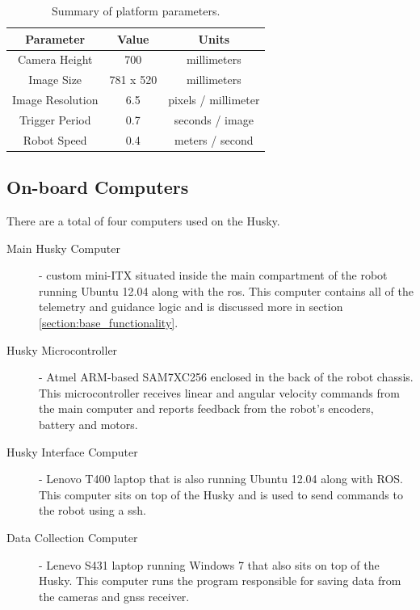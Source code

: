 \begin{table}
    \begin{center}
    \caption{Summary of platform parameters.}
    \begin{tabular}[c]{|c|c|c|}
        \hline
        Parameter & Value & Units \\
        \hline
        Camera Height    & 700       & millimeters         \\
        Image Size       & 781 x 520 & millimeters         \\
        Image Resolution & 6.5       & pixels / millimeter \\
        Trigger Period   & 0.7       & seconds / image     \\
        Robot Speed      & 0.4       & meters / second     \\
        \hline
    \end{tabular}
    \label{table:platform_params}
   \end{center}
\end{table}

\subsection{On-board Computers}

There are a total of four computers used on the Husky.

\begin{description}
\item[Main Husky Computer] - custom mini-ITX situated inside the main compartment of the robot running Ubuntu 12.04 along with the \ac{ros}. This computer contains all of the telemetry and guidance logic and is discussed more in section \ref{section:base_functionality}.  
\item[Husky Microcontroller] - Atmel ARM-based SAM7XC256 enclosed in the back of the robot chassis.  This microcontroller receives linear and angular velocity commands from the main computer and reports feedback from the robot's encoders, battery and motors. 
\item[Husky Interface Computer] - Lenovo T400 laptop that is also running Ubuntu 12.04 along with ROS.  This computer sits on top of the Husky and is used to send commands to the robot using a \ac{ssh}.
\item[Data Collection Computer] - Lenevo S431 laptop running Windows 7 that also sits on top of the Husky.  This computer runs the program responsible for saving data from the cameras and \ac{gnss} receiver.   
\end{description}

